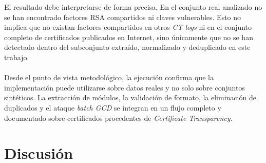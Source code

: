 El resultado debe interpretarse de forma precisa. En el conjunto real analizado no se han encontrado factores RSA compartidos ni claves vulnerables. Esto no implica que no existan factores compartidos en otros \textit{CT logs} ni en el conjunto completo de certificados publicados en Internet, sino únicamente que no se han detectado dentro del subconjunto extraído, normalizado y deduplicado en este trabajo.
\\
\\
Desde el punto de vista metodológico, la ejecución confirma que la implementación puede utilizarse sobre datos reales y no solo sobre conjuntos sintéticos. La extracción de módulos, la validación de formato, la eliminación de duplicados y el ataque \textit{batch GCD} se integran en un flujo completo y documentado sobre certificados procedentes de \textit{Certificate Transparency}.

\section{Discusión}

